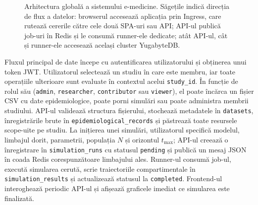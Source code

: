 \begin{figure}[t]
{
}
\caption[Arhitectura globală a sistemului]{Arhitectura globală a sistemului e-medicine.
Săgețile indică direcția de flux a datelor: browserul accesează
aplicația prin Ingress, care rutează cererile către cele două SPA-uri sau API;
API-ul publică job-uri în Redis și le consumă runner-ele dedicate;
atât API-ul, cât și runner-ele accesează același cluster YugabyteDB.}
\label{fig:arhitectura_globala}
\end{figure}

Fluxul principal de date începe cu autentificarea utilizatorului și obținerea
unui token JWT. Utilizatorul selectează un studiu în care este membru, iar toate
operațiile ulterioare sunt evaluate în contextul acelui \texttt{study\_id}.
În funcție de rolul său (\texttt{admin}, \texttt{researcher},
\texttt{contributor} sau \texttt{viewer}), el poate încărca un fișier CSV cu
date epidemiologice, poate porni simulări sau poate administra membrii
studiului. API-ul validează structura fișierului, stochează metadatele în
\texttt{datasets}, înregistrările brute în
\texttt{epidemiological\_records} și păstrează toate resursele scope-uite pe
studiu. La inițierea unei simulări, utilizatorul specifică modelul, limbajul
dorit, parametrii, populația $N$ și orizontul $t_{\max}$; API-ul creează o
înregistrare în \texttt{simulation\_runs} cu statusul \texttt{pending} și
publică un mesaj JSON în coada Redis corespunzătoare limbajului ales.
Runner-ul consumă job-ul, execută simularea cerută, scrie traiectoriile
compartimentale în \texttt{simulation\_results} și actualizează statusul la
\texttt{completed}. Frontend-ul interoghează periodic API-ul și afișează
graficele imediat ce simularea este finalizată.

